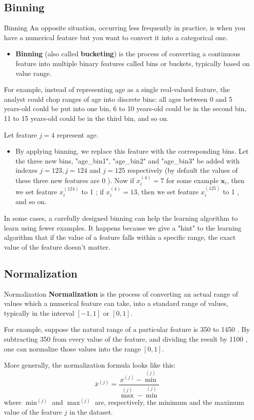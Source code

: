\documentclass[9pt,dvipsnames]{beamer}
\begin{document}
	\subsection{Binning}
	\begin{frame}{Binning}
		An opposite situation, occurring less frequently in practice, is when you have a numerical feature but you want to convert it into a categorical one.
		\begin{itemize}
			\item  \textbf{Binning} (also called \textbf{bucketing}) is the process of converting a continuous feature into multiple binary features called bins or buckets, typically based on value range. 
		\end{itemize}
		For example, instead of representing age as a single real-valued feature, the analyst could chop ranges of age into discrete bins: all ages between 0 and 5 years-old could be put into one bin, 6 to 10 years-old could be in the second bin, 11 to 15 years-old could be in the third bin, and so on.
	\end{frame}
	
	\begin{frame}
		Let feature $j=4$ represent age. 
		\begin{itemize}
			\item By applying binning, we replace this feature with the corresponding bins. Let the three new bins, "age\_bin1", "age\_bin2" and "age\_bin3" be added with indexes $j=123, j=124$ and $j=125$ respectively (by default the values of these three new features are 0 ). Now if $x_{i}^{(4)}=7$ for some example $\mathbf{x}_{i}$, then we set feature $x_{i}^{(124)}$ to 1 ; if $x_{i}^{(4)}=13$, then we set feature $x_{i}^{(125)}$ to 1 , and so on.
		\end{itemize}
	In some cases, a carefully designed binning can help the learning algorithm to learn using fewer examples. It happens because we give a "hint" to the learning algorithm that if the value of a feature falls within a specific range, the exact value of the feature doesn't matter.
	\end{frame}
	\subsection{Normalization}
	\begin{frame}{Normalization}
		\textbf{Normalization} is the process of converting an actual range of values which a numerical feature can take, into a standard range of values, typically in the interval $[-1,1]$ or $[0,1]$.
		
		For example, suppose the natural range of a particular feature is 350 to 1450 . By subtracting 350 from every value of the feature, and dividing the result by 1100 , one can normalize those values into the range $[0,1]$.
		
		More generally, the normalization formula looks like this:
		$$
		\bar{x}^{(j)}=\frac{x^{(j)}-\min ^{(j)}}{\max ^{(j)}-\min ^{(j)}}
		$$
		where $\min ^{(j)}$ and $\max ^{(j)}$ are, respectively, the minimum and the maximum value of the feature $j$ in the dataset.
	\end{frame}
	
\end{document}
